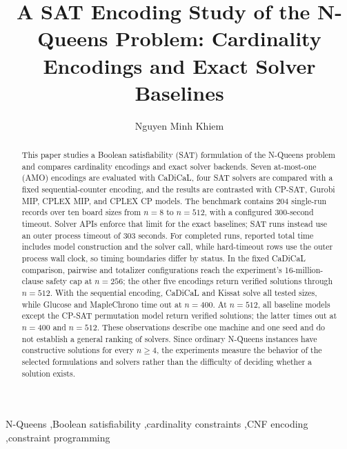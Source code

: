 \documentclass[a4paper,fleqn]{cas-sc}
\begin{document}
\let\WriteBookmarks\relax
\renewcommand{\printorcid}{}
\title[mode=title]{A SAT Encoding Study of the N-Queens Problem: Cardinality Encodings and Exact Solver Baselines}

\author[1]{Nguyen Minh Khiem}
\fnmark[1]

\begin{abstract}
This paper studies a Boolean satisfiability (SAT) formulation of the N-Queens problem and compares cardinality encodings and exact solver backends. Seven at-most-one (AMO) encodings are evaluated with CaDiCaL, four SAT solvers are compared with a fixed sequential-counter encoding, and the results are contrasted with CP-SAT, Gurobi MIP, CPLEX MIP, and CPLEX CP models. The benchmark contains 204 single-run records over ten board sizes from $n=8$ to $n=512$, with a configured 300-second timeout. Solver APIs enforce that limit for the exact baselines; SAT runs instead use an outer process timeout of 303 seconds. For completed runs, reported total time includes model construction and the solver call, while hard-timeout rows use the outer process wall clock, so timing boundaries differ by status. In the fixed CaDiCaL comparison, pairwise and totalizer configurations reach the experiment's 16-million-clause safety cap at $n=256$; the other five encodings return verified solutions through $n=512$. With the sequential encoding, CaDiCaL and Kissat solve all tested sizes, while Glucose and MapleChrono time out at $n=400$. At $n=512$, all baseline models except the CP-SAT permutation model return verified solutions; the latter times out at $n=400$ and $n=512$. These observations describe one machine and one seed and do not establish a general ranking of solvers. Since ordinary N-Queens instances have constructive solutions for every $n\geq4$, the experiments measure the behavior of the selected formulations and solvers rather than the difficulty of deciding whether a solution exists.
\end{abstract}

\begin{keywords}
N-Queens \sep Boolean satisfiability \sep cardinality constraints \sep CNF encoding \sep constraint programming
\end{keywords}
\end{document}
